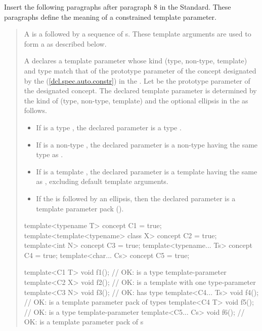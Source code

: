 Insert the following paragraphs after paragraph 8 in the \Cpp Standard. These 
paragraphs define the meaning of a constrained template parameter.

\begin{quote}
\begin{addedblock}
\setcounter{Paras}{8}
\pnum
A  is a  followed 
by a sequence of s. These template arguments
are used to form a  as described below.

\pnum
A  declares a template parameter whose 
kind (type, non-type, template) and type match that of the prototype parameter 
of the concept designated by the  
(\ref{dcl.spec.auto.constr}) in the .
%
Let  be the prototype parameter of the designated concept.
% 
The declared template parameter is determined by the kind of  
(type, non-type, template) and the optional ellipsis in the
 as follows.
% 
\begin{itemize}
\item If  is a type , the declared
parameter is a type . 

\item If  is a non-type , the declared
parameter is a non-type  having the same 
type as .

\item If  is a template , the declared
parameter is a template  having the same 
 as , excluding default template 
arguments.

\item If the  is followed by an ellipsis,
then the declared parameter is a template parameter pack ().
\end{itemize}
% 
\enterexample
\begin{codeblock}
template<typename T> concept C1 = true;
template<template<typename> class X> concept C2 = true;
template<int N> concept C3 = true;
template<typename... Ts> concept C4 = true;
template<char... Cs> concept C5 = true;

template<C1 T> void f1();     // OK:  is a type template-parameter
template<C2 X> void f2();     // OK:  is a template with one type-parameter
template<C3 N> void f3();     // OK:  has type 
template<C4... Ts> void f4(); // OK:  is a template parameter pack of types
template<C4 T> void f5();     // OK:  is a type template-parameter
template<C5... Cs> void f6(); // OK:  is a template parameter pack of s
\end{codeblock}
\exitexample


\end{addedblock}
\end{quote}
